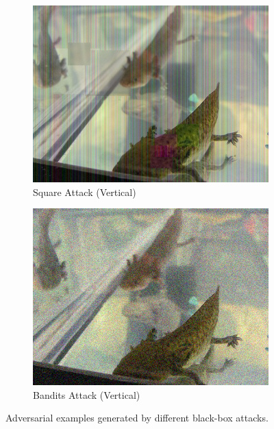 \begin{figure}[tp]
\begin{subfigure}[t]{0.31\textwidth}
    \includegraphics[width=\textwidth]{figures/chapter_classification/x_29_adv_square_8.jpg}
    \caption{Square Attack (Vertical)}
    \label{fig:square_vertical_img}
\end{subfigure}
\hfill
\begin{subfigure}[t]{0.31\textwidth}
    \centering
    \includegraphics[width=\textwidth]{figures/chapter_classification/x_29_adv_bandits_8.jpg}
    \caption{Bandits Attack (Vertical)}
    \label{fig:bandits_vertical_img}
\end{subfigure}
\caption{Adversarial examples generated by different black-box attacks.}
\label{fig.vertical_img}
\end{figure}

